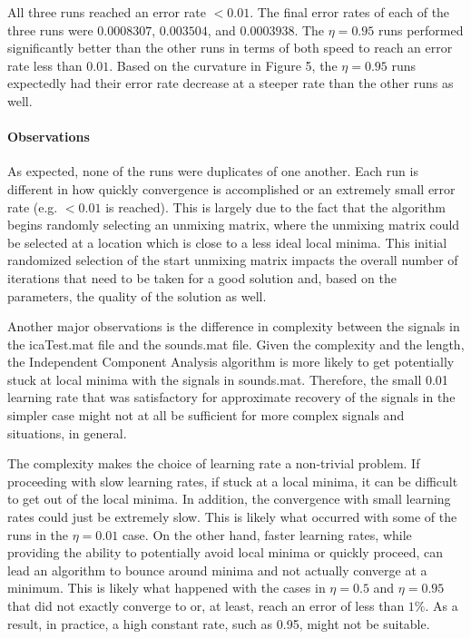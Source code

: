 \documentclass{article} %
\begin{document}
All three runs reached an error rate \(<0.01\). The final error rates of each of the three runs were \(0.0008307\), \(0.003504\), and \(0.0003938\). The \(\eta=0.95\) runs performed significantly better than the other runs in terms of both speed to reach an error rate less than \(0.01\). Based on the curvature in Figure 5, the \(\eta=0.95\) runs expectedly had their error rate decrease at a steeper rate than the other runs as well. 

\paragraph{Observations}

As expected, none of the runs were duplicates of one another. Each run is different in how quickly convergence is accomplished or an extremely small error rate (e.g. \(< 0.01\) is reached). This is largely due to the fact that the algorithm begins randomly selecting an unmixing matrix, where the unmixing matrix could be selected at a location which is close to a less ideal local minima. This initial randomized selection of the start unmixing matrix impacts the overall number of iterations that need to be taken for a good solution and, based on the parameters, the quality of the solution as well.

Another major observations is the difference in complexity between the signals in the icaTest.mat file and the sounds.mat file. Given the complexity and the length, the Independent Component Analysis algorithm is more likely to get potentially stuck at local minima with the signals in sounds.mat. Therefore, the small 0.01 learning rate that was satisfactory for approximate recovery of the signals in the simpler case might not at all be sufficient for more complex signals and situations, in general. 

The complexity makes the choice of learning rate a non-trivial problem. If proceeding with slow learning rates, if stuck at a local minima, it can be difficult to get out of the local minima. In addition, the convergence with small learning rates could just be extremely slow. This is likely what occurred with some of the runs in the \(\eta=0.01\) case. On the other hand, faster learning rates, while providing the ability to potentially avoid local minima or quickly proceed, can lead an algorithm to bounce around minima and not actually converge at a minimum. This is likely what happened with the cases in \(\eta=0.5\) and \(\eta=0.95\) that did not exactly converge to or, at least, reach an error of less than \(1\%\). As a result, in practice, a high constant rate, such as 0.95, might not be suitable.
\end{document}
